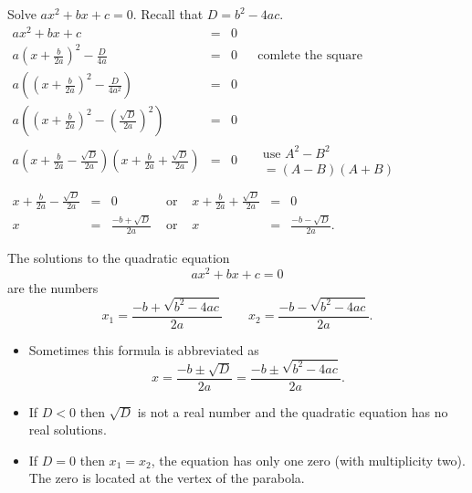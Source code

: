 \begin{frame}
\begin{problem}
Solve $ax^2+bx+c=0$. Recall that $D=b^2-4ac$.
$
\begin{array}{rcll|l}
\displaystyle ax^2+bx+c&=&0 \\
\displaystyle a\left(x +\frac{b }{2a}  \right)^2- \frac{D}{4a}&=& 0&&\text{comlete the square}\\
\displaystyle a\left(\left(x +\frac{b }{2a} \right)^2- \frac{D}{4a^2}\right)&=& 0\\
\displaystyle a\left(\left(x +\frac{b }{2a} \right)^2- \left( \frac{ \sqrt{D }}{2 a}\right)^2\right)&=& 0\\
\displaystyle a\left(x+\frac{b }{2a}-\frac{\sqrt{D}}{2a} \right)\left(x+\frac{b }{2a}+\frac{\sqrt{D}}{2a} \right)&=&0 &&\begin{array}{l} \text{use } A^2-B^2\\ =(A-B)(A+B)\end{array} \\
\end{array}
$
$
\begin{array}{rclcrcl}
\displaystyle x+\frac{b}{2a}-\frac{\sqrt{D}}{2a}&=&0 &\text{ or } & \displaystyle x+\frac{b}{2a}+\frac{\sqrt{D}}{2a}&=&0\\
x&=&\displaystyle \frac{-b+\sqrt{D}}{2a} & \text{ or } & x&=&\displaystyle \frac{-b-\sqrt{D}}{2a}.
\end{array}
$
\end{problem}
\end{frame}
\begin{frame}
\begin{theorem}
The solutions to the quadratic equation 
\[
ax^2+bx+c=0
\]
are the numbers 
\[
x_1=\frac{-b+ \sqrt{b^2-4ac}}{2a} \qquad x_2=\frac{-b- \sqrt{b^2-4ac}}{2a}.
\]
\end{theorem}
\begin{itemize}
\item Sometimes this formula is abbreviated as 
\[
x=\frac{-b\pm \sqrt{D}}{2a}=\frac{-b\pm \sqrt{b^2-4ac}}{2a}.
\]
\item If $D<0$ then $\sqrt{D}$ is not a real number and the quadratic equation has no real solutions.
\item If $D=0$ then $x_1=x_2$, the equation has only one zero (with multiplicity two). The zero is located at the vertex of the parabola.
\end{itemize}
\end{frame}